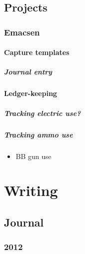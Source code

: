 \documentclass[11pt]{article}
\begin{document}
\subsection*{Projects}
\label{sec:orgbc2c97c}
\subsubsection*{Emacsen}
\label{sec:org74d4171}
\paragraph*{Capture templates}
\label{sec:org547b9cb}
\subparagraph*{Journal entry}
\label{sec:org7969bfc}
\paragraph*{Ledger-keeping}
\label{sec:org7049f7f}
\subparagraph*{Tracking electric use?}
\label{sec:org15841ec}
\subparagraph*{Tracking ammo use}
\label{sec:orgddcc981}
\begin{itemize}
\item BB gun use
\label{sec:org233584b}
\end{itemize}
\section*{Writing}
\label{sec:org02c42f8}
\startcontents[level-1]
\subsection*{Journal}
\label{sec:orgd1a4e34}
\startcontents[level-2]
\subsubsection*{2012}
\label{sec:orgbc1db93}
\startcontents[level-3]
\end{document}
